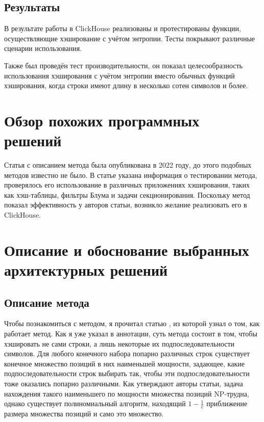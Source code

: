 \documentclass[a4paper,12pt]{extarticle}
\begin{document}
\begin{sloppypar}
\subsection{Результаты}

В результате работы в ClickHouse реализованы и протестированы функции, осуществляющие хэширование с учётом энтропии. Тесты покрывают различные сценарии использования.

Также был проведён тест производительности, он показал целесообразность использования хэширования с учётом энтропии вместо обычных функций хэширования, когда строки имеют длину в несколько сотен символов и более.

\pagebreak

\section{Обзор похожих программных решений}

Статья с описанием метода \cite{the_paper} \cite{the_paper_github} была опубликована в 2022 году, до этого подобных методов известно не было. В статье указана информация о тестировании метода, проверялось его использование в различных приложениях хэширования, таких как хэш-таблицы, фильтры Блума и задачи секционирования. Поскольку метод показал эффективность у авторов статьи, возникло желание реализовать его в ClickHouse.

\newpage

\section{Описание и обоснование выбранных архитектурных решений}
\subsection{Описание метода}
Чтобы познакомиться с методом, я прочитал статью \cite{the_paper} \cite{the_paper_github}, из которой узнал о том, как работает метод. Как я уже указал в аннотации, суть метода состоит в том, чтобы хэшировать не сами строки, а лишь некоторые их подпоследовательности символов. Для любого конечного набора попарно различных строк существует конечное множество позиций в них наименьшей мощности, задающее, какие подпоследовательности строк выбирать так, чтобы эти подпоследовательности тоже оказались попарно различными. Как утверждают авторы статьи, задача нахождения такого наименьшего по мощности множества позиций NP-трудна, однако существует полиномиальный алгоритм, находящий $1-\frac{1}{e}$ приближение размера множества позиций и само это множество. 


\end{sloppypar}
\end{document}
